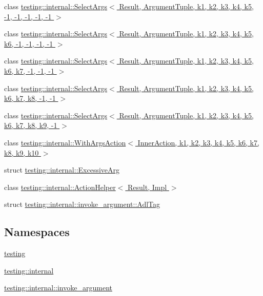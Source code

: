 \begin{DoxyCompactItemize}
\item 
class \hyperlink{classtesting_1_1internal_1_1_select_args_3_01_result_00_01_argument_tuple_00_01k1_00_01k2_00_01k6061407a5fa2cad2c495e8e16ee67874}{testing\+::internal\+::\+Select\+Args$<$ Result, Argument\+Tuple, k1, k2, k3, k4, k5, -\/1, -\/1, -\/1, -\/1, -\/1 $>$}
\item 
class \hyperlink{classtesting_1_1internal_1_1_select_args_3_01_result_00_01_argument_tuple_00_01k1_00_01k2_00_01k203aa538560773abfacd746d313c06ae}{testing\+::internal\+::\+Select\+Args$<$ Result, Argument\+Tuple, k1, k2, k3, k4, k5, k6, -\/1, -\/1, -\/1, -\/1 $>$}
\item 
class \hyperlink{classtesting_1_1internal_1_1_select_args_3_01_result_00_01_argument_tuple_00_01k1_00_01k2_00_01kf4b89906ed32c76471b80b75f77e1355}{testing\+::internal\+::\+Select\+Args$<$ Result, Argument\+Tuple, k1, k2, k3, k4, k5, k6, k7, -\/1, -\/1, -\/1 $>$}
\item 
class \hyperlink{classtesting_1_1internal_1_1_select_args_3_01_result_00_01_argument_tuple_00_01k1_00_01k2_00_01ke29a32f440a8fcb098d8685a265f9f40}{testing\+::internal\+::\+Select\+Args$<$ Result, Argument\+Tuple, k1, k2, k3, k4, k5, k6, k7, k8, -\/1, -\/1 $>$}
\item 
class \hyperlink{classtesting_1_1internal_1_1_select_args_3_01_result_00_01_argument_tuple_00_01k1_00_01k2_00_01k6840fe77dccd76bc2d4e4ee1c75cd6f1}{testing\+::internal\+::\+Select\+Args$<$ Result, Argument\+Tuple, k1, k2, k3, k4, k5, k6, k7, k8, k9, -\/1 $>$}
\item 
class \hyperlink{classtesting_1_1internal_1_1_with_args_action}{testing\+::internal\+::\+With\+Args\+Action$<$ Inner\+Action, k1, k2, k3, k4, k5, k6, k7, k8, k9, k10 $>$}
\item 
struct \hyperlink{structtesting_1_1internal_1_1_excessive_arg}{testing\+::internal\+::\+Excessive\+Arg}
\item 
class \hyperlink{classtesting_1_1internal_1_1_action_helper}{testing\+::internal\+::\+Action\+Helper$<$ Result, Impl $>$}
\item 
struct \hyperlink{structtesting_1_1internal_1_1invoke__argument_1_1_adl_tag}{testing\+::internal\+::invoke\+\_\+argument\+::\+Adl\+Tag}
\end{DoxyCompactItemize}
\subsection*{Namespaces}
\begin{DoxyCompactItemize}
\item 
 \hyperlink{namespacetesting}{testing}
\item 
 \hyperlink{namespacetesting_1_1internal}{testing\+::internal}
\item 
 \hyperlink{namespacetesting_1_1internal_1_1invoke__argument}{testing\+::internal\+::invoke\+\_\+argument}
\end{DoxyCompactItemize}

